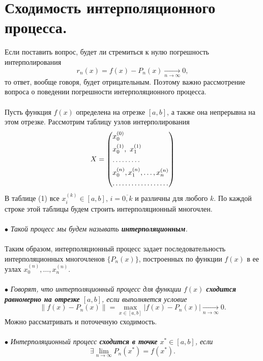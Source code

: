 \documentclass[a4paper, 12pt]{report}
\numberwithin{equation}{section}
\newcommand\Norm[1]{\left\| #1 \right\|}
\begin{document}
	 \section{Сходимость интерполяционного процесса.}
	 Если поставить вопрос, будет ли стремиться к нулю погрешность интерполирования $$r_n(x) = f(x) - P_n(x)\xrightarrow[n\to\infty]{}0,$$
	 то ответ, вообще говоря, будет отрицательным. Поэтому важно рассмотрение вопроса о поведении погрешности интерполяционного процесса.\\\\
	 Пусть функция $f(x)$ определена на отрезке $[a,b]$, а также она непрерывна на этом отрезке. Рассмотрим таблицу узлов интерполирования
	 \begin{equation}
	 	X = \left( 
	 \begin{gathered} 
	 	x_0^{(0)} \hfill \\ 
	 	x_0^{(1)},\ x_1^{(1)}\hfill  \\
	 	\dots\dots\dots \hfill \\
	 	 x_0^{(n)}, x_1^{(n)},\ldots, x_n^{(n)} \hfill \\
	 	 \dots\dots\dots\dots\dots\dots \hfill
	 \end{gathered} 
	 \right)
	 \end{equation}
	 В таблице (1) все $x_i^{(k)} \in [a,b]$, $i=\overline{0,k}$ и различны для любого $k$. По каждой строке этой таблицы будем строить интерполяционный многочлен. \\\\
	 $\bullet$ \textit{Такой процесс мы будем называть \textbf{интерполяционным}.}\\\\
	 Таким образом, интерполяционный процесс задает последовательность интерполяционных многочленов $\{P_n(x)\}$, построенных по функции $f(x)$ в ее узлах $x_0^{(n)},\ldots, x_n^{(n)}$.\\\\
	 $\bullet$ \textit{Говорят, что интерполяционный процесс для функции $f(x)$ \textbf{сходится равномерно на отрезке} $[a,b]$, если выполняется условие} \begin{equation}
	 	\Norm{f(x) - P_n(x)} = \max_{x\in[a,b]} |f(x) - P_n(x)|\xrightarrow[n\to\infty]{}0.
	 \end{equation}
	 Можно рассматривать и поточечную сходимость.\\\\ 
	 $\bullet$ \textit{Интерполяционный процесс \textbf{сходится в точке} $x^* \in [a,b]$, если} \begin{equation}
	 	\exists \lim\limits_{n\to\infty}P_n(x^*) = f(x^*).
	 \end{equation}
\end{document}
